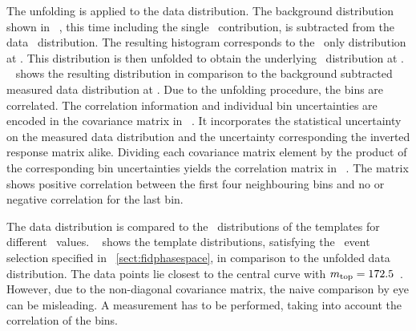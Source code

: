 The unfolding is applied to the data distribution. The background distribution shown in \fig~, this time including the single \tquark\ contribution, is subtracted from the data \mlbr\ distribution. The resulting histogram corresponds to the \ttbar\ only distribution at \recolevel. This distribution is then unfolded to obtain the underlying \mlbt\ distribution at \truelevel.
%
\Fig~ shows the resulting distribution in comparison to the background subtracted measured data distribution at \recolevel. 
%
Due to the unfolding procedure, the bins are correlated. The correlation information and individual bin uncertainties are encoded in the covariance matrix in \fig~. 
%
%
It incorporates the statistical uncertainty on the measured data distribution and the uncertainty corresponding the inverted response matrix alike.
%
Dividing each covariance matrix element by the product of the corresponding bin uncertainties yields the correlation matrix in \fig~. The matrix shows positive correlation between the first four neighbouring bins and no or negative correlation for the last bin. 
%
%

The data distribution is compared to the \truelevel\ distributions of the templates for different \mt\ values. \Fig~ shows the template distributions, satisfying the \truelevel\ event selection specified in \sect~\ref{sect:fidphasespace}, in comparison to the unfolded data distribution. The data points lie closest to the central curve with $m_{\mathrm{top}}=172.5$~\GeV. However, due to the non-diagonal covariance matrix, the naive comparison by eye can be misleading. A measurement has to be performed, taking into account the correlation of the bins.












